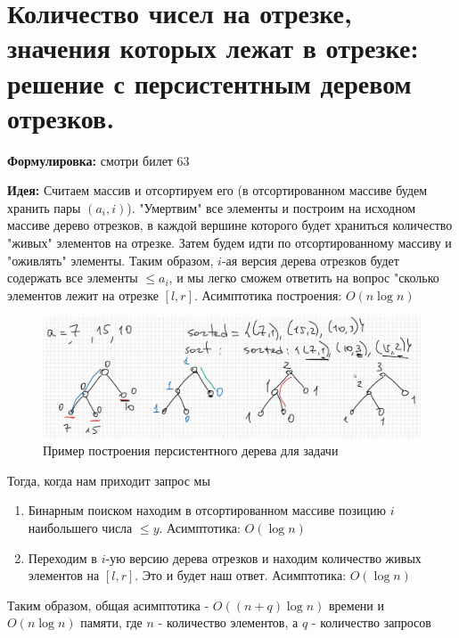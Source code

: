 \section{Количество чисел на отрезке, значения которых лежат в отрезке: решение с персистентным деревом отрезков.}
\par \textbf{Формулировка:} смотри билет 63
\par \textbf{Идея:} Считаем массив и отсортируем его (в отсортированном массиве будем хранить пары $(a_i, i)$). "Умертвим" все элементы и построим на исходном массиве дерево отрезков, в каждой вершине которого будет храниться количество "живых" элементов на отрезке. Затем будем идти по отсортированному массиву и "оживлять" элементы. Таким образом, $i$-ая версия дерева отрезков будет содержать все элементы $\leqslant a_i$, и мы легко сможем ответить на вопрос "сколько элементов лежит на отрезке $[l,r]$. Асимптотика построения: $O(n \log n)$
\begin{figure}[h]
    \centering
    \includegraphics[width=\linewidth]{images/65-66_persistent task}
    \caption{Пример построения персистентного дерева для задачи}
\end{figure}
\par Тогда, когда нам приходит запрос мы \begin{enumerate}
    \item Бинарным поиском находим в отсортированном массиве позицию $i$ наибольшего числа $\leqslant y$. Асимптотика: $O(\log n)$
    \item Переходим в $i$-ую версию дерева отрезков и находим количество живых элементов на $[l,r]$. Это и будет наш ответ. Асимптотика: $O(\log n)$
\end{enumerate}
\par Таким образом, общая асимптотика - $O((n+q)\log n)$ времени и $O(n \log n)$ памяти, где $n$ - количество элементов, а $q$ - количество запросов